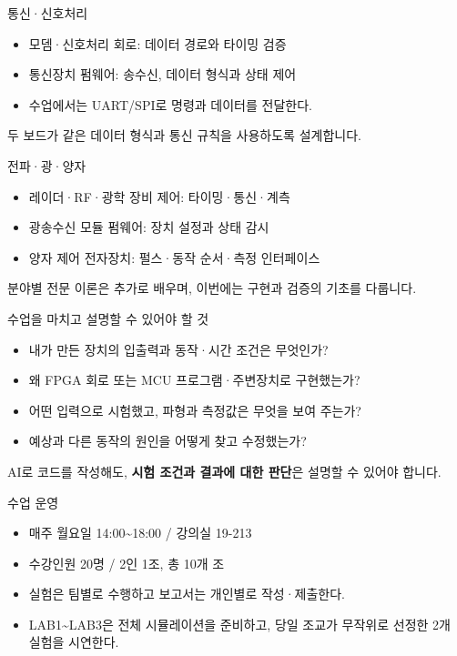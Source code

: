 \documentclass[aspectratio=169,11pt,t]{beamer}
\begin{document}
\begin{frame}{통신·신호처리}
\begin{itemize}
\item 모뎀·신호처리 회로: 데이터 경로와 타이밍 검증
\item 통신장치 펌웨어: 송수신, 데이터 형식과 상태 제어
\item 수업에서는 UART/SPI로 명령과 데이터를 전달한다.
\end{itemize}
\vspace{0.35cm}
두 보드가 같은 데이터 형식과 통신 규칙을 사용하도록 설계합니다.
\end{frame}

\begin{frame}{전파·광·양자}
\begin{itemize}
\item 레이더·RF·광학 장비 제어: 타이밍·통신·계측
\item 광송수신 모듈 펌웨어: 장치 설정과 상태 감시
\item 양자 제어 전자장치: 펄스·동작 순서·측정 인터페이스
\end{itemize}
\vspace{0.35cm}
분야별 전문 이론은 추가로 배우며, 이번에는 구현과 검증의 기초를 다룹니다.
\end{frame}

\begin{frame}{수업을 마치고 설명할 수 있어야 할 것}
\begin{itemize}
\item 내가 만든 장치의 입출력과 동작·시간 조건은 무엇인가?
\item 왜 FPGA 회로 또는 MCU 프로그램·주변장치로 구현했는가?
\item 어떤 입력으로 시험했고, 파형과 측정값은 무엇을 보여 주는가?
\item 예상과 다른 동작의 원인을 어떻게 찾고 수정했는가?
\end{itemize}
\vspace{0.3cm}
AI로 코드를 작성해도, \textbf{시험 조건과 결과에 대한 판단}은 설명할 수 있어야 합니다.
\end{frame}

\begin{frame}{수업 운영}
\begin{itemize}
\item 매주 월요일 14:00\textasciitilde{}18:00 / 강의실 19-213
\item 수강인원 20명 / 2인 1조, 총 10개 조
\item 실험은 팀별로 수행하고 보고서는 개인별로 작성·제출한다.
\item LAB1\textasciitilde{}LAB3은 전체 시뮬레이션을 준비하고, 당일 조교가 무작위로 선정한 2개 실험을 시연한다.
\end{itemize}
\end{frame}
\end{document}
